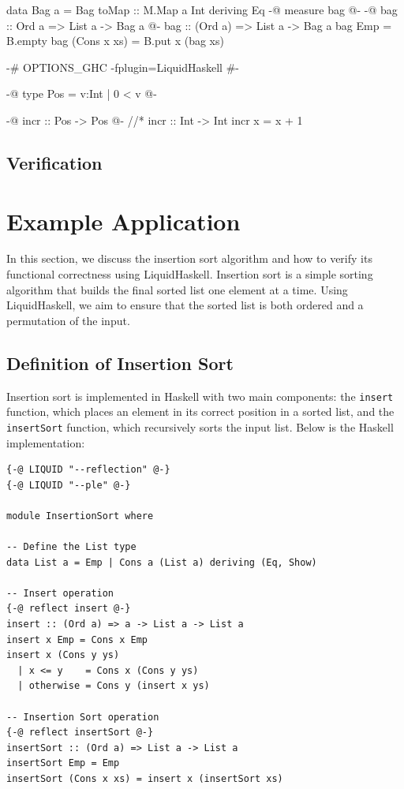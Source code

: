 \documentclass[]{rptuseminar}
\begin{document}
\begin{haskell}
data Bag a = Bag { toMap :: M.Map a Int } deriving Eq
{-@ measure bag @-}
{-@ bag :: Ord a => List a -> Bag a @-}
bag :: (Ord a) => List a -> Bag a
bag Emp = B.empty
bag (Cons x xs) = B.put x (bag xs)
\end{haskell}

\begin{haskell}
 {-# OPTIONS_GHC -fplugin=LiquidHaskell #-}

 {-@ type Pos = {v:Int | 0 < v} @-}

 {-@ incr :: Pos -> Pos @-} //*\label{srcline:typerefinement}
 incr :: Int -> Int
 incr x = x + 1 
\end{haskell}

\subsection{Verification}


\section{Example Application}

In this section, we discuss the insertion sort algorithm and how to verify its functional correctness using LiquidHaskell. Insertion sort is a simple sorting algorithm that builds the final sorted list one element at a time. Using LiquidHaskell, we aim to ensure that the sorted list is both ordered and a permutation of the input.

\subsection{Definition of Insertion Sort}

Insertion sort is implemented in Haskell with two main components: the \texttt{insert} function, which places an element in its correct position in a sorted list, and the \texttt{insertSort} function, which recursively sorts the input list. Below is the Haskell implementation:

\begin{lstlisting}[caption=Insertion Sort Implementation]
{-@ LIQUID "--reflection" @-}
{-@ LIQUID "--ple" @-}

module InsertionSort where

-- Define the List type
data List a = Emp | Cons a (List a) deriving (Eq, Show)

-- Insert operation
{-@ reflect insert @-}
insert :: (Ord a) => a -> List a -> List a
insert x Emp = Cons x Emp
insert x (Cons y ys)
  | x <= y    = Cons x (Cons y ys)
  | otherwise = Cons y (insert x ys)

-- Insertion Sort operation
{-@ reflect insertSort @-}
insertSort :: (Ord a) => List a -> List a
insertSort Emp = Emp
insertSort (Cons x xs) = insert x (insertSort xs)
\end{lstlisting}
\end{document}
